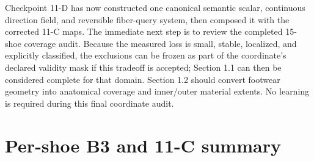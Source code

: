 \documentclass[11pt]{article}
\begin{document}
Checkpoint 11-D has now constructed one canonical semantic scalar, continuous direction
field, and reversible fiber-query system, then composed it with the corrected 11-C maps.
The immediate next step is to review the completed 15-shoe coverage audit. Because the
measured loss is small, stable, localized, and explicitly classified, the exclusions can
be frozen as part of the coordinate's declared validity mask if this tradeoff is accepted;
Section 1.1 can then be considered complete for that domain. Section 1.2 should convert footwear
geometry into anatomical coverage and inner/outer material extents. No learning is
required during this final coordinate audit.

\appendix
\section{Per-shoe B3 and 11-C summary}
\end{document}
